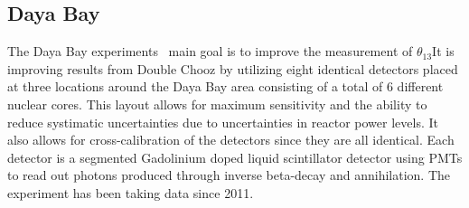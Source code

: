\subsection{Daya Bay}

The Daya Bay experiments~\cite{44DayaBay} main goal is to improve the measurement of $\theta_{13}$It is improving results from Double Chooz by utilizing eight identical detectors placed at three locations around the Daya Bay area consisting of a total of 6 different nuclear cores. This layout allows for maximum sensitivity and the ability to reduce systimatic uncertainties due to uncertainties in reactor power levels. It also allows for cross-calibration of the detectors since they are all identical. Each detector is a segmented Gadolinium doped liquid scintillator detector using PMTs to read out photons produced through inverse beta-decay and annihilation. The experiment has been taking data since 2011.


